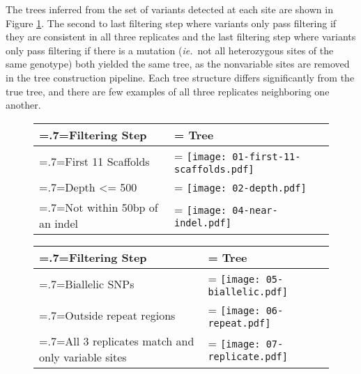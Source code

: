 The trees inferred from the set of variants detected at each site are shown in Figure \ref{fig:ev_filtertrees}. The second to last filtering step where variants only pass filtering if they are consistent in all three replicates and the last filtering step where variants only pass filtering if there is a mutation (\textit{ie.}\ not all heterozygous sites of the same genotype) both yielded the same tree, as the nonvariable sites are removed in the tree construction pipeline. Each tree structure differs significantly from the true tree, and there are few examples of all three replicates neighboring one another.

\begin{figure}

\centering
\begin{tabularx}{.7\textwidth}{ >{\hsize=.7\hsize\linewidth=\hsize}X >{\hsize=1.3\hsize\linewidth=\hsize}X}
\toprule
Filtering Step & Tree \\
\midrule
First 11 Scaffolds & \texttt{[image: 01-first-11-scaffolds.pdf]} \\
Depth <= 500 & \texttt{[image: 02-depth.pdf]} \\
Not within 50bp of an indel & \texttt{[image: 04-near-indel.pdf]} \\
\bottomrule
\end{tabularx}
\end{figure}

\begin{figure}
\centering
\begin{tabularx}{.7\textwidth}{ >{\hsize=.7\hsize\linewidth=\hsize}X >{\hsize=1.3\hsize\linewidth=\hsize}X }
\toprule
Filtering Step & Tree \\
\midrule
Biallelic SNPs & \texttt{[image: 05-biallelic.pdf]}\\
Outside repeat \newline regions & \texttt{[image: 06-repeat.pdf]} \\
All 3 replicates match and only variable sites & \texttt{[image: 07-replicate.pdf]}\\
\bottomrule
\end{tabularx}
\label{fig:ev_filtertrees}
\end{figure}

